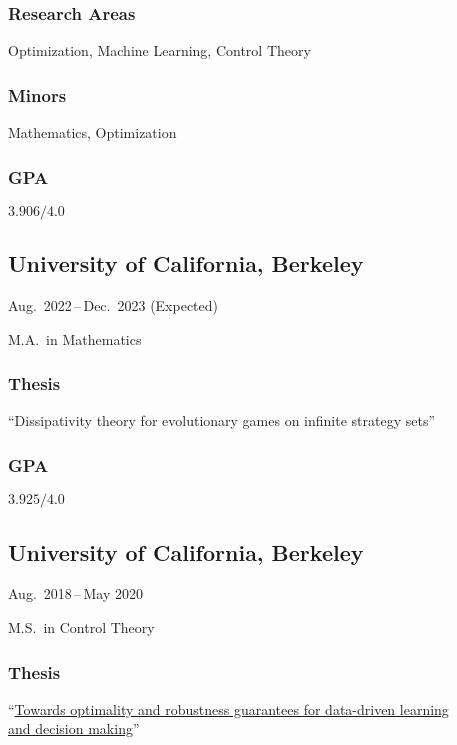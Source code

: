 \documentclass[11pt]{article}
\newcommand{\sectionwidth}{1in}		%
\newcommand{\subsectionskip}{\baselineskip}	%
\newcommand{\cvdates}[2]{\hfill#1\,--\,#2}	%
\begin{document}
	\subsubsection{Research Areas}
	Optimization, Machine Learning, Control Theory
	
	\subsubsection{Minors}
	Mathematics, Optimization
	
	\begin{gpa-on}
		\subsubsection{GPA}
		$3.906/4.0$
	\end{gpa-on}
	
	\vspace*{\subsectionskip}

	\subsection{University of California, Berkeley}
	\cvdates{Aug.\ 2022}{Dec.\ 2023 (Expected)}

	\hspace*{\sectionwidth}M.A.\ in Mathematics

	\subsubsection{Thesis}
	``Dissipativity theory for evolutionary games on infinite strategy sets''

	\begin{gpa-on}
		\subsubsection{GPA}
		$3.925/4.0$
	\end{gpa-on}

	\vspace*{\subsectionskip}
	
	\subsection{University of California, Berkeley}
	\cvdates{Aug.\ 2018}{May 2020}
	
	\hspace*{\sectionwidth}M.S.\ in Control Theory
	
	\subsubsection{Thesis}
	``\href{https://brendon-anderson.github.io/files/publications/ms_thesis.pdf}{Towards optimality and robustness guarantees for data-driven learning \\
	\hspace*{\sectionwidth}and decision making}''
	
\end{document}
